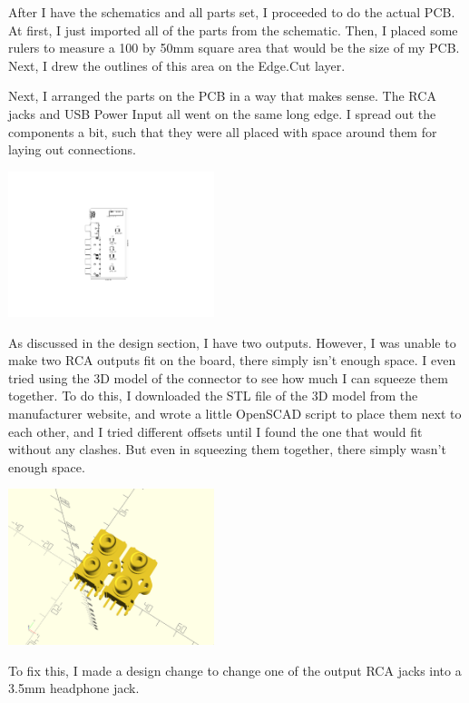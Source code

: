 \documentclass[a4paper]{article}
\begin{document}
After I have the schematics and all parts set, I proceeded to do the actual PCB. At first, I just imported all of the parts from the schematic. Then, I placed some rulers to measure a 100 by 50mm square area that would be the size of my PCB. Next, I drew the outlines of this area on the Edge.Cut layer.

Next, I arranged the parts on the PCB in a way that makes sense. The RCA jacks and USB Power Input all went on the same long edge. I spread out the components a bit, such that they were all placed with space around them for laying out connections.

\begin{center}
  \includegraphics[trim={11cm 5cm 12cm 5cm},clip,width=6cm]{images/pcb.pdf}
\end{center}

As discussed in the design section, I have two outputs. However, I was unable to make two RCA outputs fit on the board, there simply isn't enough space. I even tried using the 3D model of the connector to see how much I can squeeze them together. To do this, I downloaded the STL file of the 3D model from the manufacturer website, and wrote a little OpenSCAD script to place them next to each other, and I tried different offsets until I found the one that would fit without any clashes. But even in squeezing them together, there simply wasn't enough space.

\begin{center}
\includegraphics[width=6cm,trim={7cm 6cm 7cm 7cm},clip]{models/model}  
\end{center}

To fix this, I made a design change to change one of the output RCA jacks into a 3.5mm headphone jack.
\end{document}
